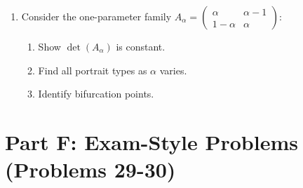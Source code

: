 \documentclass[12pt]{article}
\begin{document}
\begin{enumerate}[resume]
\item Consider the one-parameter family $A_\alpha = \begin{pmatrix} \alpha & \alpha-1 \\ 1-\alpha & \alpha \end{pmatrix}$:
\begin{enumerate}[label=(\alph*)]
    \item Show $\det(A_\alpha)$ is constant.
    \item Find all portrait types as $\alpha$ varies.
    \item Identify bifurcation points.
\end{enumerate}
\end{enumerate}

\section*{Part F: Exam-Style Problems (Problems 29-30)}
\end{document}
